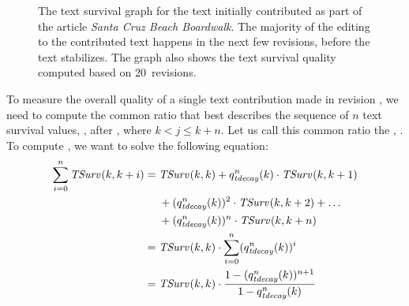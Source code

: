 \begin{figure}[tbph]
\centering
{}
\caption{The text survival graph for the text initially contributed
	as part of the article \textit{Santa Cruz Beach Boardwalk}.
	The majority of the editing to the contributed text happens
	in the next few revisions, before the text stabilizes.
	The graph also shows the text survival quality
	computed based on 20~revisions.
	}
\label{fig:ts-SantaCruzBeachBoardwalk}
\end{figure}

To measure the overall quality of a single text contribution
made in revision , we need to compute the common ratio
that best describes the sequence of $n$ text survival values,
, after , where $k < j \le k+n$.
Let us call this common ratio the ,
.
To compute , we want to solve the following equation:
\begin{align*}
    \sum_{i=0}^n \tsurv{}{k,k+i} = {} & \tsurv{}{k,k} + \quality{tdecay}{n}{k} \cdot \tsurv{}{k,k+1} \\
    & + (\quality{tdecay}{n}{k})^2 \cdot \tsurv{}{k,k+2} + \ldots \\
    & + (\quality{tdecay}{n}{k})^n \cdot \tsurv{}{k,k+n} \\
    = {} & \tsurv{}{k,k} \cdot \sum_{i=0}^n (\quality{tdecay}{n}{k})^i \\
    = {} & \tsurv{}{k,k} \cdot \frac{1 - (\quality{tdecay}{n}{k})^{n+1}}{1 - \quality{tdecay}{n}{k}} \\
\end{align*}

